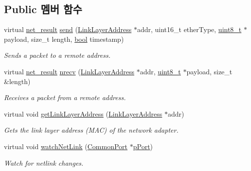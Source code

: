 \subsection*{Public 멤버 함수}
\begin{DoxyCompactItemize}
\item 
virtual \hyperlink{avbts__osnet_8hpp_a21b2b4b5e479ef3adfc039ac30c961cd}{net\+\_\+result} \hyperlink{class_windows_p_c_a_p_network_interface_a1ff75616ab34c1d7df689b5d8ab7a59b}{send} (\hyperlink{class_link_layer_address}{Link\+Layer\+Address} $\ast$addr, uint16\+\_\+t ether\+Type, \hyperlink{stdint_8h_aba7bc1797add20fe3efdf37ced1182c5}{uint8\+\_\+t} $\ast$payload, size\+\_\+t length, \hyperlink{avb__gptp_8h_af6a258d8f3ee5206d682d799316314b1}{bool} timestamp)
\begin{DoxyCompactList}\small\item\em Sends a packet to a remote address. \end{DoxyCompactList}\item 
virtual \hyperlink{avbts__osnet_8hpp_a21b2b4b5e479ef3adfc039ac30c961cd}{net\+\_\+result} \hyperlink{class_windows_p_c_a_p_network_interface_a08a4fa234a006e89838677a381d8e052}{nrecv} (\hyperlink{class_link_layer_address}{Link\+Layer\+Address} $\ast$addr, \hyperlink{stdint_8h_aba7bc1797add20fe3efdf37ced1182c5}{uint8\+\_\+t} $\ast$payload, size\+\_\+t \&length)
\begin{DoxyCompactList}\small\item\em Receives a packet from a remote address. \end{DoxyCompactList}\item 
virtual void \hyperlink{class_windows_p_c_a_p_network_interface_acf4cbb5b708d3feb8e970da49d853fae}{get\+Link\+Layer\+Address} (\hyperlink{class_link_layer_address}{Link\+Layer\+Address} $\ast$addr)
\begin{DoxyCompactList}\small\item\em Gets the link layer address (M\+AC) of the network adapter. \end{DoxyCompactList}\item 
virtual void \hyperlink{class_windows_p_c_a_p_network_interface_a2d20b70884c94962cd11bd51d92617b4}{watch\+Net\+Link} (\hyperlink{class_common_port}{Common\+Port} $\ast$\hyperlink{linux_2src_2daemon__cl_8cpp_aca059781ed4d0e5fca3b46246d5c5ad3}{p\+Port})
\begin{DoxyCompactList}\small\item\em Watch for netlink changes. \end{DoxyCompactList}\item 

\end{DoxyCompactItemize}
